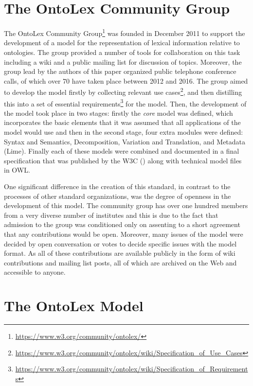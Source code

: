 \documentclass[12pt,a4paper]{elex2017}
\begin{document}
\section{The OntoLex Community Group}

The OntoLex Community
Group\footnote{\url{https://www.w3.org/community/ontolex/}}  was founded in
December 2011 to support the development of a model for the representation of
lexical information relative to ontologies. The group provided a number of tools
for collaboration on this task including a wiki and a public mailing list for
discussion of topics. Moreover, the group lead by the authors of this paper
organized public telephone conference calls, of which over 70 have taken place
between 2012 and 2016. The group aimed to develop the model firstly by
collecting relevant use
cases\footnote{\url{https://www.w3.org/community/ontolex/wiki/Specification_of_Use_Cases}},
and then distilling this into a set of essential
requirements\footnote{\url{https://www.w3.org/community/ontolex/wiki/Specification_of_Requirements}}
for the model. Then, the development of the model took place in two stages:
firstly the \emph{core} model was defined, which incorporates the basic elements
that it was assumed that all applications of the model would use and then in the
second stage, four extra modules were defined: Syntax and Semantics,
Decomposition, Variation and Translation, and Metadata (Lime).
Finally each of these models were combined and documented in a final
specification that was published by the W3C (\cite{cimiano2016lexicon}) along with
technical model files in OWL.

One significant difference in the creation of this standard, in contrast to the
processes of other standard organizations, was the degree of openness in the
development of this model. The community group has over one hundred members from a
very diverse number of institutes and this is due to the fact that admission to
the group was conditioned only on assenting to a short agreement that
any contributions would be open. Moreover, many issues of the model were
decided by open conversation or votes to decide specific issues with the model
format. As all of these contributions are available publicly in the form of wiki
contributions and mailing list posts, all of which are archived on the Web and
accessible to anyone. 

\section{The OntoLex Model}
\end{document}
